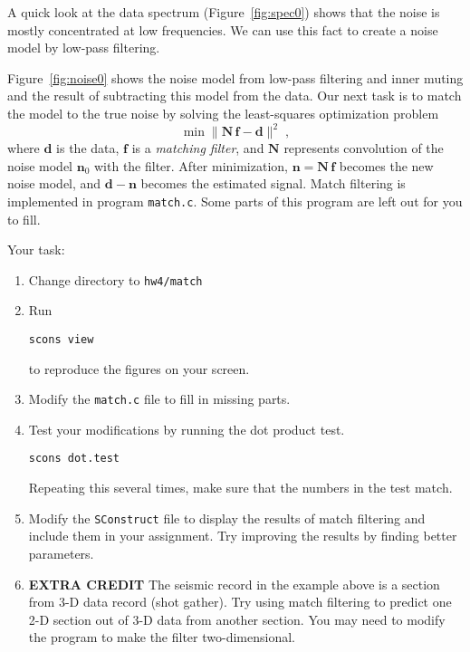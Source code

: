 
A quick look at the data spectrum (Figure~\ref{fig:spec0}) shows that the
noise is mostly concentrated at low frequencies. We can use this fact
to create a noise model by low-pass filtering.


Figure~\ref{fig:noise0} shows the noise model from low-pass filtering
and inner muting and the result of subtracting this model from the
data. Our next task is to match the model to the true noise by solving
the least-squares optimization problem
\begin{equation}
\label{eq:ls}
\min \|\mathbf{N}\,\mathbf{f} - \mathbf{d}\|^2\;,
\end{equation}
where $\mathbf{d}$ is the data, $\mathbf{f}$ is a \emph{matching filter}, and
$\mathbf{N}$ represents convolution of the noise model
$\mathbf{n}_0$ with the filter. After minimization, $\mathbf{n} =
\mathbf{N}\,\mathbf{f}$ becomes the new noise model, and
$\mathbf{d}-\mathbf{n}$ becomes the estimated signal. Match filtering
is implemented in program \texttt{match.c}. Some parts of this program
are left out for you to fill.

\lstset{language=c,numbers=left,numberstyle=\tiny,showstringspaces=false}


Your task:
\begin{enumerate}
\item Change directory to \texttt{hw4/match}
\item Run 
\begin{verbatim}
scons view
\end{verbatim}
to reproduce the figures on your screen.
\item Modify the \texttt{match.c} file to fill in missing parts.
\item Test your modifications by running the dot product test.
\begin{verbatim}
scons dot.test
\end{verbatim}
Repeating this several times, make sure that the numbers in the test match.
\item Modify the \texttt{SConstruct} file to display the results of
  match filtering and include them in your assignment. Try improving
  the results by finding better parameters.
\item \textbf{EXTRA CREDIT} The seismic record in the example above is
  a section from 3-D data record (shot gather). Try using match
  filtering to predict one 2-D section out of 3-D data from another
  section. You may need to modify the program to make the filter
  two-dimensional.
\end{enumerate}

